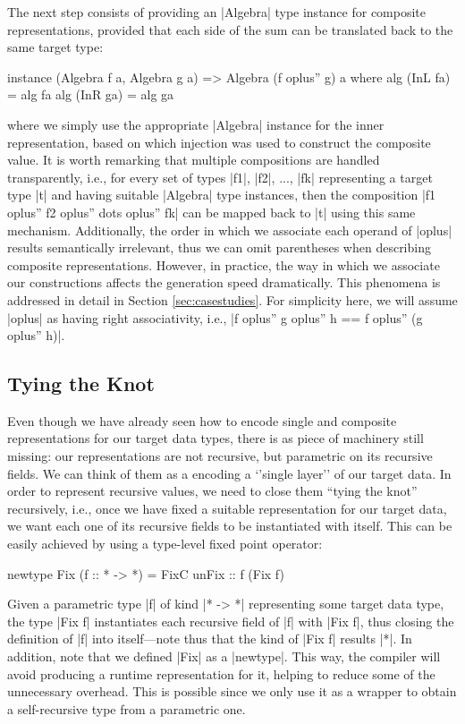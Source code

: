 The next step consists of providing an |Algebra| type instance for composite
representations, provided that each side of the sum can be translated back to
the same target type:

\begin{code}
instance (Algebra f a, Algebra g a) => Algebra (f oplus'' g) a
  where  alg (InL fa) = alg fa
         alg (InR ga) = alg ga
\end{code}
%
where we simply use the appropriate |Algebra| instance for the inner
representation, based on which injection was used to construct the composite
value.
%
It is worth remarking that multiple compositions are handled transparently,
i.e., for every set of types |f1|, |f2|, ..., |fk| representing a target type
|t| and having suitable |Algebra| type instances, then the composition |f1
oplus'' f2 oplus'' dots oplus'' fk| can be mapped back to |t| using this same
mechanism.
%
Additionally, the order in which we associate each operand of |oplus| results
semantically irrelevant, thus we can omit parentheses when describing composite
representations.
%
However, in practice, the way in which we associate our constructions affects
the generation speed dramatically.
%
This phenomena is addressed in detail in Section \ref{sec:casestudies}.
%
For simplicity here, we will assume |oplus| as having right associativity, i.e.,
|f oplus'' g oplus'' h == f oplus'' (g oplus'' h)|.


%
\subsection{Tying the Knot}

Even though we have already seen how to encode single and composite
representations for our target data types, there is as piece of machinery still
missing: our representations are not recursive, but parametric on its recursive
fields.
%
We can think of them as a encoding a `'single layer'' of our target data.
%
In order to represent recursive values, we need to close them ``tying the knot''
recursively, i.e., once we have fixed a suitable representation for our target
data, we want each one of its recursive fields to be instantiated with itself.
%
This can be easily achieved by using a type-level fixed point operator:

\begin{code}
newtype Fix (f :: * -> *) = FixC { unFix :: f (Fix f) }
\end{code}
%
Given a parametric type |f| of kind |* -> *| representing some target data type,
the type |Fix f| instantiates each recursive field of |f| with |Fix f|, thus
closing the definition of |f| into itself---note thus that the kind of |Fix f|
results |*|.
%
In addition, note that we defined |Fix| as a |newtype|.
%
This way, the compiler will avoid producing a runtime representation for it,
helping to reduce some of the unnecessary overhead.
%
This is possible since we only use it as a wrapper to obtain a self-recursive
type from a parametric one.


